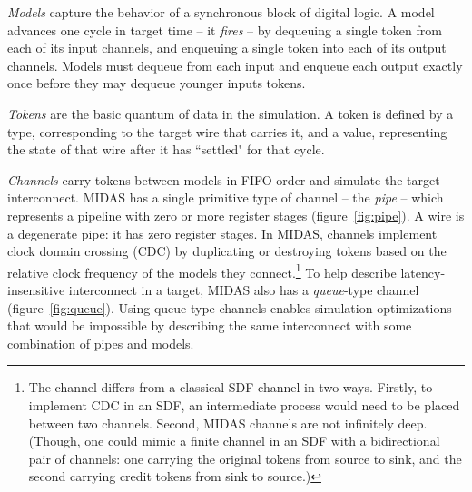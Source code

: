 \emph{Models} capture the behavior of a synchronous block of digital logic. A model advances one cycle in
target time -- it \emph{fires} -- by dequeuing a single token from each of its
input channels, and enqueuing a single token into each of its output
channels.  Models must dequeue from each input and enqueue each output
exactly once before they may dequeue younger inputs tokens.

\emph{Tokens} are the basic quantum of data in the simulation. A token is
defined by a type, corresponding to the target wire that carries it, and a
value, representing the state of that wire after it has ``settled" for that
cycle.

\emph{Channels} carry tokens between models in FIFO order and simulate the
target interconnect. MIDAS has a single primitive type of
channel --  the \emph{pipe} -- which represents a pipeline with zero or more
register stages (figure~\ref{fig:pipe}). A wire is a degenerate pipe: it has
zero register stages. In MIDAS, channels implement clock domain crossing (CDC) by duplicating or destroying tokens based on the
relative clock frequency of the models they connect.\footnote{The channel
differs from a classical SDF channel in two ways.  Firstly, to implement CDC in
an SDF, an intermediate process would need to be placed between two channels.
Second, MIDAS channels are not infinitely deep.  (Though, one could mimic a
finite channel in an SDF with a bidirectional pair of channels: one carrying
the original tokens from source to sink, and the second carrying credit tokens
from sink to source.)} To help describe latency-insensitive interconnect in a
target, MIDAS also has a \emph{queue}-type channel (figure~\ref{fig:queue}).
Using queue-type channels enables simulation optimizations that would be
impossible by describing the same interconnect with some combination of pipes
and models.

